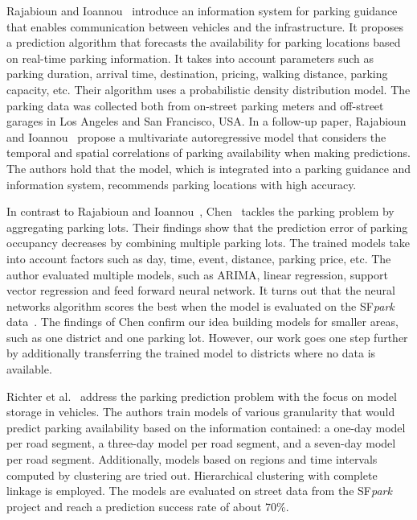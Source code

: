 Rajabioun and Ioannou~\cite{rajabioun2013} introduce an information system for parking guidance that enables communication between vehicles and the infrastructure. It proposes a prediction algorithm that forecasts the availability for parking locations based on real-time parking information. It takes into account parameters such as parking duration, arrival time, destination, pricing, walking distance, parking capacity, etc. Their algorithm uses a probabilistic density distribution model. The parking data was collected both from on-street parking meters and off-street garages in Los Angeles and San Francisco, USA. In a follow-up paper, Rajabioun and Ioannou~\cite{rajabioun2015} propose a multivariate autoregressive model that considers the temporal and spatial correlations of parking availability when making predictions. The authors hold that the model, which is integrated into a parking guidance and information system, recommends parking locations with high accuracy. 

In contrast to Rajabioun and Ioannou~\cite{rajabioun2013}, Chen~\cite{xchen} tackles the parking problem by aggregating parking lots. Their findings show that the prediction error of parking occupancy decreases by combining multiple parking lots. The trained models take into account factors such as day, time, event, distance, parking price, etc. The author evaluated multiple models, such as ARIMA, linear regression, support vector regression and feed forward neural network. It turns out that the neural networks algorithm scores the best when the model is evaluated on the SF\textit{park} data~\cite{sfpark_open_data}. The findings of Chen confirm our idea building models for smaller areas, such as one district and one parking lot. However, our work goes one step further by additionally transferring the trained model to districts where no data is available. 

Richter et al.~\cite{richter} address the parking prediction problem with the focus on model storage in vehicles. The authors train models of various granularity that would predict parking availability based on the information contained: a one-day model per road segment, a three-day model per road segment, and a seven-day model per road segment. Additionally, models based on regions and time intervals computed by clustering are tried out.
Hierarchical clustering with complete linkage is employed. The models are evaluated on street data from the SF\textit{park} project\cite{sfpark_open_data} and reach a prediction success rate of about 70\%. 

